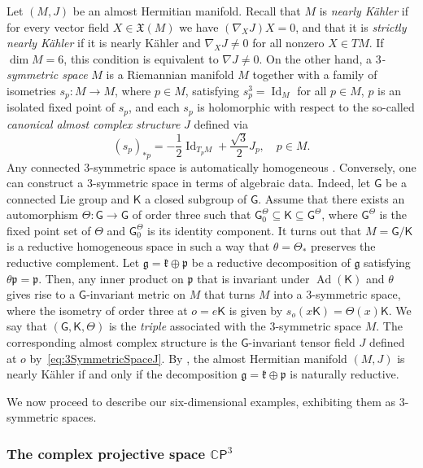 \documentclass[11pt,a4paper,final]{amsart}
\newcommand{\s}{\mathsf}
\newcommand{\g}{\mathfrak}
\newcommand{\Ad}{\operatorname{Ad}}
\newcommand{\C}{\mathbb{C}}
\theoremstyle{definition}
\begin{document}
Let $(M,J)$ be an almost Hermitian manifold.
Recall that $M$ is \textit{nearly Kähler} if for every vector field $X\in\g{X}(M)$ we have $(\nabla_{X}J)X=0$, and that it is \textit{strictly nearly Kähler} if it is nearly Kähler and $\nabla_{X}J\neq 0$ for all nonzero $X\in TM$.
If $\dim M = 6$, this condition is equivalent to $\nabla J \neq 0$.
On the other hand, a \textit{$3$-symmetric space} $M$ is a Riemannian manifold $M$ together with a family of isometries $s_{p}\colon M\to M$, where $p\in M$, satisfying $s_{p}^{3}=\operatorname{Id}_{M}$ for all $p\in M$, $p$ is an isolated fixed point of $s_{p}$, and each $s_{p}$ is holomorphic with respect to the so-called \textit{canonical almost complex structure} $J$ defined via
\begin{equation}\label{eq:3SymmetricSpaceJ}
	(s_{p})_{*p}=-\frac{1}{2}\operatorname{Id}_{T_{p}M}+\frac{\sqrt{3}}{2}J_{p}, \quad p\in M.
\end{equation}
Any connected 3-symmetric space is automatically homogeneous \cite[Theorem 4.8]{Gray}.
Conversely, one can construct a $3$-symmetric space in terms of algebraic data.
Indeed, let $\s{G}$ be a connected Lie group and $\s{K}$ a closed subgroup of $\s{G}$.
Assume that there exists an automorphism $\Theta\colon \s{G}\to\s{G}$ of order three such that $\s{G}^{\Theta}_{0}\subseteq\s{K}\subseteq\s{G}^{\Theta}$, where $\s{G}^{\Theta}$ is the fixed point set of $\Theta$ and $\s{G}^{\Theta}_{0}$ is its identity component.
It turns out that $M=\s{G}/\s{K}$ is a reductive homogeneous space in such a way that $\theta=\Theta_{*}$ preserves the reductive complement.
Let $\g{g}=\g{k}\oplus\g{p}$ be a reductive decomposition of $\g{g}$ satisfying $\theta\g{p}=\g{p}$.
Then, any inner product on $\g{p}$ that is invariant under $\Ad(\s{K})$ and $\theta$ gives rise to a $\s{G}$-invariant metric on $M$ that turns $M$ into a $3$-symmetric space, where the isometry of order three at $o=e\s{K}$ is given by $s_{o}(x\s{K})=\Theta(x)\s{K}$.
We say that $(\s{G},\s{K},\Theta)$ is the \textit{triple} associated with the $3$-symmetric space $M$.
The corresponding almost complex structure is the $\s{G}$-invariant tensor field $J$ defined at $o$ by~\eqref{eq:3SymmetricSpaceJ}.
By \cite[Proposition~5.6]{Gray}, the almost Hermitian manifold $(M,J)$ is nearly Kähler if and only if the decomposition $\g{g}=\g{k}\oplus\g{p}$ is naturally reductive.

We now proceed to describe our six-dimensional examples, exhibiting them as $3$-symmetric spaces.

\subsubsection{The complex projective space $\C\mathsf{P}^{3}$}\label{subsection:CP3Description}
	
\end{document}
